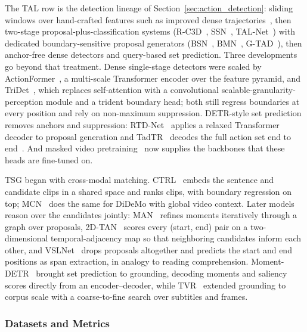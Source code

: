 The TAL row is the detection lineage of Section~\ref{sec:action_detection}: sliding windows over hand-crafted features such as improved dense trajectories~\cite{wang2013idt}, then two-stage proposal-plus-classification systems (R-C3D~\cite{xu2017rcc3d}, SSN~\cite{zhao2017temporal}, TAL-Net~\cite{chao2018talnet}) with dedicated boundary-sensitive proposal generators (BSN~\cite{lin2018bsn}, BMN~\cite{lin2019bmn}, G-TAD~\cite{xu2020gtad}), then anchor-free dense detectors and query-based set prediction. Three developments go beyond that treatment. Dense single-stage detectors were scaled by ActionFormer~\cite{zhang2022actionformer}, a multi-scale Transformer encoder over the feature pyramid, and TriDet~\cite{shi2023tridet}, which replaces self-attention with a convolutional scalable-granularity-perception module and a trident boundary head; both still regress boundaries at every position and rely on non-maximum suppression. DETR-style set prediction removes anchors and suppression: RTD-Net~\cite{tan2021rtdnet} applies a relaxed Transformer decoder to proposal generation and TadTR~\cite{liu2022tadtr} decodes the full action set end to end~\cite{liu2022e2etad,kim2024tetad}. And masked video pretraining~\cite{tong2022videomae,wang2023videomaev2} now supplies the backbones that these heads are fine-tuned on.

TSG began with cross-modal matching. CTRL~\cite{gao2017tall} embeds the sentence and candidate clips in a shared space and ranks clips, with boundary regression on top; MCN~\cite{hendricks2017mcn} does the same for DiDeMo with global video context. Later models reason over the candidates jointly: MAN~\cite{zhang2019man} refines moments iteratively through a graph over proposals, 2D-TAN~\cite{zhang2020twodtan} scores every (start, end) pair on a two-dimensional temporal-adjacency map so that neighboring candidates inform each other, and VSLNet~\cite{zhang2020vslnet} drops proposals altogether and predicts the start and end positions as span extraction, in analogy to reading comprehension. Moment-DETR~\cite{lei2021qvhighlights} brought set prediction to grounding, decoding moments and saliency scores directly from an encoder--decoder, while TVR~\cite{lei2020tvr} extended grounding to corpus scale with a coarse-to-fine search over subtitles and frames.

\subsubsection{Datasets and Metrics}

